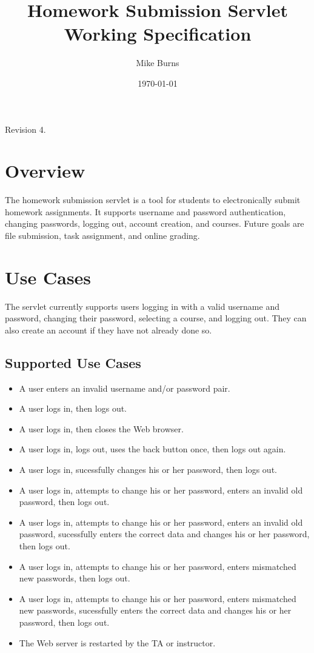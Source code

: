 \documentclass[a4paper]{article}
\begin{document}
\title{Homework Submission Servlet Working Specification}
\author{Mike Burns}
\date{\today}

\maketitle

Revision 4.

\section{Overview}\label{sec:overview}

The homework submission servlet is a tool for students to electronically submit
homework assignments. It supports username and password authentication,
changing passwords, logging out, account creation, and courses.
Future goals are file submission, task assignment, and
online grading.

\section{Use Cases}\label{sec:usecases}

The servlet currently supports users logging in with a valid username and
password, changing their password, selecting a course, and logging out. They
can also create an account if they have not already done so.

\subsection{Supported Use Cases}\label{subsec:detailed-usecases}

\begin{itemize}
\item{A user enters an invalid username and/or password pair.}
\item{A user logs in, then logs out.}
\item{A user logs in, then closes the Web browser.}
\item{A user logs in, logs out, uses the back button once, then logs out again.}
\item{A user logs in, sucessfully changes his or her password, then logs out.}
\item{A user logs in, attempts to change his or her password, enters an invalid
old password, then logs out.}
\item{A user logs in, attempts to change his or her password, enters an invalid
old password, sucessfully enters the correct data and changes his or her password,
then logs out.}
\item{A user logs in, attempts to change his or her password, enters mismatched
new passwords, then logs out.}
\item{A user logs in, attempts to change his or her password, enters mismatched
new passwords, sucessfully enters the correct data and changes his or her password,
then logs out.}
\item{The Web server is restarted by the TA or instructor.}
\end{itemize}
\end{document}
